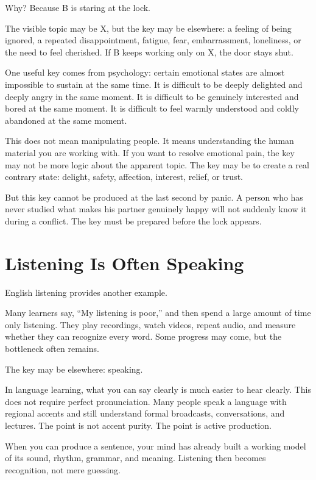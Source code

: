 Why? Because B is staring at the lock.

The visible topic may be X, but the key may be elsewhere: a feeling of being ignored, a repeated disappointment, fatigue, fear, embarrassment, loneliness, or the need to feel cherished. If B keeps working only on X, the door stays shut.

One useful key comes from psychology: certain emotional states are almost impossible to sustain at the same time. It is difficult to be deeply delighted and deeply angry in the same moment. It is difficult to be genuinely interested and bored at the same moment. It is difficult to feel warmly understood and coldly abandoned at the same moment.

This does not mean manipulating people. It means understanding the human material you are working with. If you want to resolve emotional pain, the key may not be more logic about the apparent topic. The key may be to create a real contrary state: delight, safety, affection, interest, relief, or trust.

But this key cannot be produced at the last second by panic. A person who has never studied what makes his partner genuinely happy will not suddenly know it during a conflict. The key must be prepared before the lock appears.

\section*{Listening Is Often Speaking}

English listening provides another example.

Many learners say, ``My listening is poor,'' and then spend a large amount of time only listening. They play recordings, watch videos, repeat audio, and measure whether they can recognize every word. Some progress may come, but the bottleneck often remains.

The key may be elsewhere: speaking.

In language learning, what you can say clearly is much easier to hear clearly. This does not require perfect pronunciation. Many people speak a language with regional accents and still understand formal broadcasts, conversations, and lectures. The point is not accent purity. The point is active production.

When you can produce a sentence, your mind has already built a working model of its sound, rhythm, grammar, and meaning. Listening then becomes recognition, not mere guessing.

